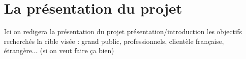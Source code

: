 \section{La présentation du projet}
Ici on redigera la présentation du projet
présentation/introduction
les objectifs recherchés
la cible visée : grand public, professionnels, clientèle française, étrangère... (si on veut faire ça bien)
